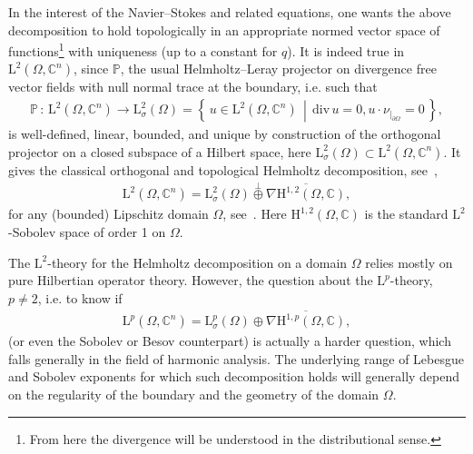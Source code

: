 \documentclass[AHL,Unicode,longabstracts,published]{cedram}
\renewcommand*{\div}{\mathrm{div\,}}
\newcommand{\bbP}{\mathbb{P}}
\newcommand{\bbC}{\mathbb{C}}
\newcommand{\rmH}{\mathrm{H}}%
\newcommand{\rmL}{\mathrm{L}}
\begin{document}
In the interest of the Navier--Stokes and related equations, one wants the above decomposition to hold topologically in an appropriate normed vector space of functions\footnote{From here the divergence will be understood in the distributional sense.} with uniqueness (up to a constant for $q$). It is indeed true in $\rmL^2(\Omega,\bbC^n)$, since $\bbP$, the usual Helmholtz--Leray projector on divergence free vector fields with null normal trace at the boundary, i.e. such that
\begin{align*}
\bbP\,:\, \rmL^2\left(\Omega,\bbC^n\right) \longrightarrow \rmL^2_{\sigma}(\Omega)=
\left\{\, u\in \rmL^2\left(\Omega,\bbC^n\right)\,\middle|\, \div u = 0, u\cdot\nu_{|_{\partial\Omega}} =0\,\right\},
\end{align*}
is well-defined, linear, bounded, and unique by construction of the orthogonal projector on a closed subspace of a Hilbert space, here $\rmL^2_{\sigma}(\Omega)\subset\rmL^2(\Omega,\bbC^n)$. It gives the classical orthogonal and topological Helmholtz decomposition, see~\cite[Chapter~2,~Section~2.5]{SohrBook2001},
\begin{align*}
\rmL^2\left(\Omega,\bbC^n\right)= \rmL^2_{\sigma}(\Omega)\overset{\perp}{\oplus}\overline{\nabla {\rmH^{1,2}(\Omega,\bbC)}},
\end{align*}
for any (bounded) Lipschitz domain $\Omega$, see~\cite[Lemma~2.5.3]{SohrBook2001}. Here $\rmH^{1,2}(\Omega,\bbC)$ is the standard $\rmL^2$-Sobolev space of order 1 on $\Omega$.

The $\rmL^2$-theory for the Helmholtz decomposition on a domain $\Omega$ relies mostly on pure Hilbertian operator theory. However, the question about the $\rmL^p$-theory, $p\neq 2$, i.e. to know if
\begin{align}\label{HodgeDecompLpIntro}
\rmL^p\left(\Omega,\bbC^n\right)= \rmL^p_{\sigma}(\Omega){\oplus}\overline{\nabla {\rmH}^{1,p}(\Omega,\bbC)},
\end{align}
(or even the Sobolev or Besov counterpart) is actually a harder question, which falls generally in the field of harmonic analysis. The underlying range of Lebesgue and Sobolev exponents for which such decomposition holds will generally depend on the regularity of the boundary and the geometry of the domain $\Omega$.
\end{document}
